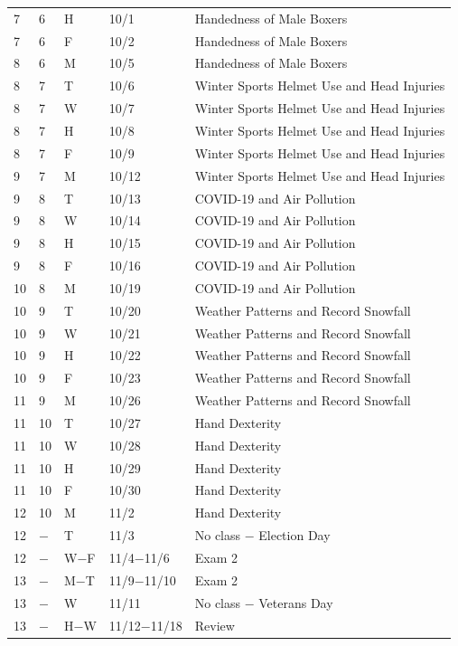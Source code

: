 \documentclass[
]{report}
\begin{document}
\begin{longtable}{|p{}|l|p{}|l|p{}|}
7& 6& H& 10/1& Handedness of Male Boxers \\*
7& 6& F& 10/2& Handedness of Male Boxers \\ \hline
8& 6& M& 10/5& Handedness of Male Boxers \\*
8& 7& T& 10/6& Winter Sports Helmet Use and Head Injuries \\*
8& 7& W& 10/7& Winter Sports Helmet Use and Head Injuries \\*	
8& 7& H& 10/8& Winter Sports Helmet Use and Head Injuries \\*
8& 7& F& 10/9& Winter Sports Helmet Use and Head Injuries \\ \hline
9& 7& M& 10/12& Winter Sports Helmet Use and Head Injuries \\*
9& 8& T& 10/13& COVID-19 and Air Pollution \\*
9& 8& W& 10/14& COVID-19 and Air Pollution \\*	
9& 8& H& 10/15& COVID-19 and Air Pollution \\*
9& 8& F& 10/16& COVID-19 and Air Pollution \\ \hline
10& 8& M& 10/19& COVID-19 and Air Pollution \\*
10& 9& T& 10/20& Weather Patterns and Record Snowfall \\*
10& 9& W& 10/21& Weather Patterns and Record Snowfall \\*	
10& 9& H& 10/22& Weather Patterns and Record Snowfall \\*
10& 9& F& 10/23& Weather Patterns and Record Snowfall \\ \hline
11& 9& M& 10/26& Weather Patterns and Record Snowfall \\*
11& 10& T& 10/27& Hand Dexterity \\*
11& 10& W& 10/28& Hand Dexterity \\*	
11& 10& H& 10/29& Hand Dexterity \\*
11& 10& F& 10/30& Hand Dexterity \\ \hline
12& 10& M& 11/2& Hand Dexterity \\*
12& $-$& T& 11/3& No class  $-$  Election Day \\*
12& $-$& W$-$F& 11/4$-$11/6& Exam 2 \\ \hline
13& $-$& M$-$T& 11/9$-$11/10& Exam 2 \\*
13& $-$& W& 11/11& No class  $-$  Veterans Day \\*
13& $-$& H$-$W&11/12$-$11/18& Review \\ \hline
\end{longtable}
\end{document}
